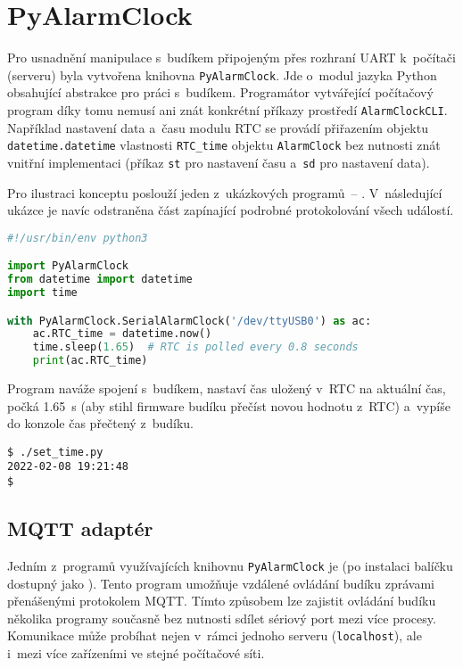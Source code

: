 \section{PyAlarmClock}
\label{sec:PyAlarmClock}
Pro usnadnění manipulace s~budíkem připojeným přes rozhraní UART k~počítači
(serveru) byla vytvořena knihovna \texttt{PyAlarmClock}. Jde o~modul jazyka
Python obsahující abstrakce pro práci s~budíkem. Programátor vytvářející
počítačový program díky tomu nemusí ani znát konkrétní příkazy prostředí
\texttt{AlarmClockCLI}. Například nastavení data a~času modulu \acs{RTC} se
provádí přiřazením objektu \texttt{datetime.datetime} vlastnosti
\verb|RTC_time| objektu \texttt{AlarmClock} bez nutnosti znát vnitřní
implementaci (příkaz \texttt{st} pro nastavení času a~\texttt{sd} pro nastavení
data).

Pro ilustraci konceptu poslouží jeden z~ukázkových programů~--
. V~následující ukázce je navíc
odstraněna část zapínající podrobné protokolování všech událostí.
\begin{lstlisting}[language=Python,style=numbers]
#!/usr/bin/env python3

import PyAlarmClock
from datetime import datetime
import time

with PyAlarmClock.SerialAlarmClock('/dev/ttyUSB0') as ac:
    ac.RTC_time = datetime.now()
    time.sleep(1.65)  # RTC is polled every 0.8 seconds
    print(ac.RTC_time)
\end{lstlisting}
Program naváže spojení s~budíkem, nastaví čas uložený v~RTC na aktuální čas,
počká \SI{1,65}{\second} (aby stihl firmware budíku přečíst novou hodnotu
z~RTC) a~vypíše do konzole čas přečtený z~budíku.
\begin{lstlisting}[style=terminal]
$ ./set_time.py
2022-02-08 19:21:48
$
\end{lstlisting}


\subsection{MQTT adaptér}
Jedním z~programů využívajících knihovnu \texttt{PyAlarmClock} je
 (po instalaci balíčku
dostupný jako ). Tento program umožňuje vzdálené ovládání
budíku zprávami přenášenými protokolem MQTT. Tímto způsobem lze zajistit
ovládání budíku několika programy současně bez nutnosti sdílet sériový port
mezi více procesy. Komunikace může probíhat nejen v~rámci jednoho serveru
(\texttt{localhost}), ale i~mezi více zařízeními ve stejné počítačové síti.

